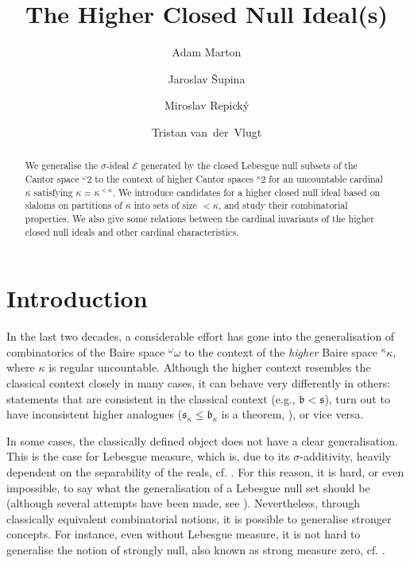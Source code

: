 \documentclass[11pt,nosumlimits,fleqn,reqno]{amsart}
\title{The Higher Closed Null Ideal(s)}
\author[A. Marton]{Adam Marton}
\author[J. \v{S}upina]{Jaroslav \v{S}upina}
\author[M. Repick\'y]{Miroslav Repick\'y}
\author[T. van~der~Vlugt]{Tristan van~der~Vlugt}
\theoremstyle{definition}
\newcommand{\fr}{\mathfrak}
\newcommand{\omom}{{}^{\omega}\omega}
\newcommand{\kaka}{{}^{\kappa}\kappa}
\begin{document}
	
	
	\begin{abstract}
		We generalise the $\sigma$-ideal $\mathcal E$ generated by the closed Lebesgue null subsets of the Cantor space ${}^\omega 2$ to the context of higher Cantor spaces ${}^\kappa 2$ for an uncountable cardinal $\kappa$ satisfying $\kappa=\kappa^{<\kappa}$. We introduce candidates for a higher closed null ideal based on slaloms on partitions of $\kappa$ into sets of size ${<}\kappa$, and study their combinatorial properties. We also give some relations between the cardinal invariants of the higher closed null ideals and other cardinal characteristics.
	\end{abstract}
	
	\maketitle
	
	
	\section{Introduction}\label{sec:introduction}
	
	In the last two decades, a considerable effort has gone into the generalisation of combinatorics of the Baire space $\omom$ to the context of the \emph{higher} Baire space $\kaka$, where $\kappa$ is regular uncountable. Although the higher context resembles the classical context closely in many cases, it can behave very differently in others: statements that are consistent in the classical context (e.g., $\fr b<\fr s$), turn out to have inconsistent higher analogues ($\fr s_\kappa\leq \fr b_\kappa$ is a theorem, \cite{RaghavanShelah2017}), or vice versa. 
	
	In some cases, the classically defined object does not have a clear generalisation.  This is the case for Lebesgue measure, which is, due to its $\sigma$-additivity, heavily dependent on the separability of the reals, cf. \cite{AgostiniBarreraDimonte}. For this reason, it is hard, or even impossible, to say what the generalisation of a Lebesgue null set should be (although several attempts have been made, see \cite{ShelahNull,FriedmanLaguzzi,CohenShelah}). 
	Nevertheless, through classically equivalent combinatorial notions, it is possible to generalise stronger concepts. For instance, even without Lebesgue measure, it is not hard to generalise the notion of strongly null, also known as strong measure zero, cf. \cite{Halko1996,HalkoShelah2001}. 
	
\end{document}
